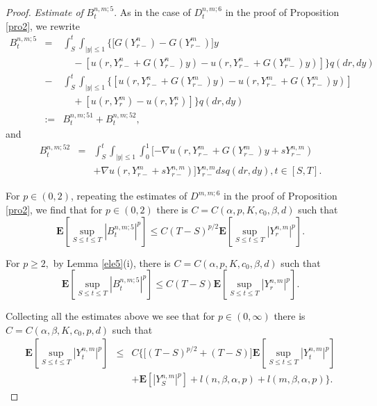 \documentclass[11pt]{amsart}
\theoremstyle{plain}
\numberwithin{equation}{section}
\begin{document}
\begin{proof}
\emph{Estimate of }$B_t^{n,m;5}.$ As in the case of $D_t^{n,m;6}$ in the
proof of Proposition \ref{pro2}, we rewrite 
\begin{eqnarray*}
B_{t}^{n,m;5} &=&\int_{S}^{t}\int_{\left\vert y\right\vert \leq 1}\Big\{\lbrack G\left( Y_{r-}^{n}\right) -G\left( Y_{r-}^{m}\right) ]y \\
&&\quad -\left[ u\left( r,Y_{r-}^{n}+G\left( Y_{r-}^{n}\right) y\right)
-u\left( r,Y_{r-}^{n}+G\left( Y_{r-}^{m}\right) y\right) \right] \Big\}q\left( dr,dy\right) \\
&-&\int_{S}^{t}\int_{\left\vert y\right\vert \leq 1}\{[u\left(
r,Y_{r-}^{n}+G\left( Y_{r-}^{m}\right) y\right) -u\left(
r,Y_{r-}^{m}+G\left( Y_{r-}^{m}\right) y\right) ] \\
&&\quad +\left[ u\left( r,Y_{r}^{m}\right) -u\left( r,Y_{r}^{n}\right) \right] \}q\left( dr,dy\right) \\
&:=&B_{t}^{n,m;51}+B_{t}^{n,m;52},
\end{eqnarray*}and 
\begin{eqnarray*}
B_{t}^{n,m;52} &=&\int_{S}^{t}\int_{\left\vert y\right\vert \leq
1}\int_{0}^{1}[-\nabla u\left( r,Y_{r-}^{m}+G\left( Y_{r-}^{m}\right)
y+sY_{r-}^{n,m}\right) \\
&&+\nabla u\left( r,Y_{r-}^{m}+sY_{r-}^{n,m}\right) ]Y_{r-}^{n,m}dsq\left(
dr,dy\right) ,t\in \left[ S,T\right] .
\end{eqnarray*}

For $p\in \left( 0,2\right) $, repeating the estimates of $D^{m,m;6}$ in the
proof of Proposition \ref{pro2}, we find that for $p\in \left( 0,2\right) $
there is $C=C\left( \alpha ,p,K,c_{0},\beta ,d\right) $ such that\begin{equation*}
\mathbf{E}\left[ \sup_{S\leq t\leq T}\left\vert B_{t}^{n,m;5}\right\vert ^{p}\right] \leq C\left( T-S\right) ^{p/2}\mathbf{E}\left[ \sup_{S\leq t\leq
T}\left\vert Y_{r}^{n,m}\right\vert ^{p}\right] .
\end{equation*}

For $p\geq 2,$ by Lemma \ref{ele5}(i), there is $C=C\left( \alpha
,p,K,c_{0},\beta ,d\right) $ such that\begin{equation*}
\mathbf{E}\left[ \sup_{S\leq t\leq T}\left\vert B_{t}^{n,m;5}\right\vert ^{p}\right] \leq C\left( T-S\right) \mathbf{E}\left[ \sup_{S\leq t\leq
T}\left\vert Y_{r}^{n,m}\right\vert ^{p}\right] .
\end{equation*}

Collecting all the estimates above we see that for $p\in \left( 0,\infty
\right) $ there is $C=C\left( \alpha ,\beta ,K,c_{0},p,d\right) $ such that 
\begin{eqnarray*}
\mathbf{E}\left[ \sup_{S\leq t\leq T}\left\vert Y_{t}^{n,m}\right\vert ^{p}\right] &\leq &C\Big\{\lbrack \left( T-S\right) ^{p/2}+(T-S)]\mathbf{E}\left[
\sup_{S\leq t\leq T}\left\vert Y_{t}^{n,m}\right\vert ^{p}\right] \\
&&+\mathbf{E}\left[ \left\vert Y_{S}^{n,m}\right\vert ^{p}\right] +l\left(
n,\beta ,\alpha ,p\right) +l\left( m,\beta ,\alpha ,p\right) \Big\}.
\end{eqnarray*}


\end{proof}
\end{document}

